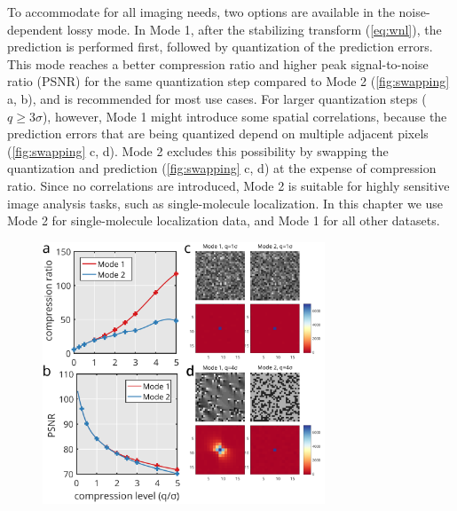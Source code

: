     To accommodate for all imaging needs, two options are available in the noise-dependent lossy mode. In Mode 1, after the stabilizing transform (\autoref{eq:wnl}), the prediction is performed first, followed by quantization of the prediction errors. This mode reaches a better compression ratio and higher peak signal-to-noise ratio (PSNR) for the same quantization step compared to Mode 2 (\autoref{fig:swapping} a, b), and is recommended for most use cases. For larger quantization steps ($q \geq 3 \sigma$), however, Mode 1 might introduce some spatial correlations, because the prediction errors that are being quantized depend on multiple adjacent pixels (\autoref{fig:swapping} c, d). Mode 2 excludes this possibility by swapping the quantization and prediction (\autoref{fig:swapping} c, d) at the expense of compression ratio. Since no correlations are introduced, Mode 2 is suitable for highly sensitive image analysis tasks, such as single-molecule localization. In this chapter we use Mode 2 for single-molecule localization data, and Mode 1 for all other datasets.
  
    \begin{figure}[bhtp]
      \centering
      \includegraphics[page=1,width=0.75\textwidth]{swapping}
      \label{fig:swapping}
    \end{figure}


